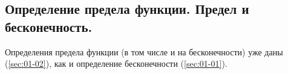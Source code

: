 \subsection{%
  Определение предела функции. Предел и бесконечность.%
}

Определения предела функции (в том числе и на бесконечности) уже даны
(\ref{sec:01-02}), как и определение бесконечности (\ref{sec:01-01}).
